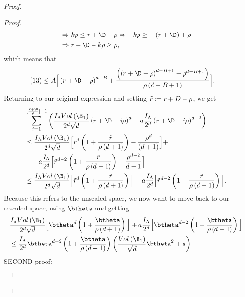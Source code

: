 \begin{proof}
\begin{proof}
\begin{align*}
            &\Rightarrow k\rho \leq r+\D-\rho \Rightarrow -k\rho \geq -\left(r+\D\right)+\rho \\
            &\Rightarrow r+\D-k\rho \geq \rho,
    \end{align*}
    which means that
    \begin{align*}
        \left(13\right)&\leq A\Big[\left(r+\D-\rho\right)^{d-B} + \frac{\left(\left(r+\D-\rho\right)^{d-B+1} - \rho^{d-B+1}\right)}{\rho\left(d-B+1\right)}\Big].
    \end{align*}
    Returning to our original expression and setting $\Tilde{r}:=r+D-\rho$, we get
    \begin{align*}
        &\sum_{i=1}^{[\frac{r+\D}{\rho}]-1} \left(\frac{I_\Lambda Vol\left(\B_1\right)}{2^d\sqrt{d}}\left(r+\D-i\rho\right)^d+a\frac{I_\Lambda}{2^d}\left(r+\D-i\rho\right)^{d-2}\right)\\
        &\leq \frac{I_\Lambda Vol\left(\B_1\right)}{2^d\sqrt{d}}\Big[\Tilde{r}^d\left(1+\frac{\Tilde{r}}{\rho \left(d+1\right)}\right) - \frac{\rho^d}{\left(d+1\right)}\Big] + \\
        &\qquad a\frac{I_\Lambda}{2^d}\Big[\Tilde{r}^{d-2}\left(1+\frac{\Tilde{r}}{\rho\left(d-1\right)}\right) - \frac{\rho^{d-2}}{d-1}\Big] \\
        &\leq \frac{I_\Lambda Vol\left(\B_1\right)}{2^d\sqrt{d}}\Big[\Tilde{r}^d\left(1+\frac{\Tilde{r}}{\rho \left(d+1\right)}\right)\Big] +
        a\frac{I_\Lambda}{2^d}\Big[\Tilde{r}^{d-2}\left(1+\frac{\Tilde{r}}{\rho \left(d-1\right)}\right)\Big].
    \end{align*}
    Because this refers to the unscaled space, we now want to move back to our rescaled space, using $\btheta$ and getting
    \begin{align*}
        &\frac{I_\Lambda Vol\left(\B_1\right)}{2^d\sqrt{d}}\Big[\btheta^d\left(1+\frac{\btheta}{\rho \left(d+1\right)}\right)\Big] +
        a\frac{I_\Lambda}{2^d}\Big[\btheta^{d-2}\left(1+\frac{\btheta}{\rho \left(d-1\right)}\right)\Big] \\
        &\leq \frac{I_\Lambda}{2^d}\btheta^{d-2}\left(1+\frac{\btheta}{\rho \left(d-1\right)}\right)\left(\frac{Vol\left(\B_1\right)}{\sqrt{d}}\btheta^2 + a\right).
    \end{align*}
    SECOND proof: 
    \begin{align*}

\end{align*}
\end{proof}
\end{proof}
